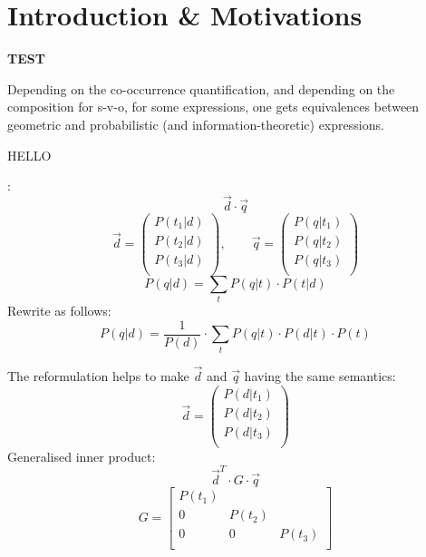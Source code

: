 \section{Introduction \& Motivations}




{\large \bf  TEST }


Depending on the co-occurrence quantification, and depending on the composition for s-v-o, for some expressions, one  gets equivalences between geometric and probabilistic (and information-theoretic) expressions.


HELLO

\cite{Wong/Yao:95}:
\[
\vec{d} \cdot \vec{q}
\]
\[
\vec{d} =
	\left(
	\begin{matrix}
	P(t_1|d)\\
	P(t_2|d)\\
	P(t_3|d)\\
	\end{matrix}
	\right),
\qquad
\vec{q} =
	\left(
	\begin{matrix}
	P(q|t_1)\\
	P(q|t_2)\\
	P(q|t_3)\\
	\end{matrix}
	\right)
\]
\[
P(q|d) = \sum_t P(q|t) \cdot P(t|d)
\]
Rewrite as follows:
\[
P(q|d) = \frac{1}{P(d)} \cdot \sum_t P(q|t) \cdot P(d|t) \cdot P(t)
\]

The reformulation helps
to make $\vec{d}$ and $\vec{q}$ having the same semantics:
\[
\vec{d} =
	\left(
	\begin{matrix}
	P(d|t_1)\\
	P(d|t_2)\\
	P(d|t_3)\\
	\end{matrix}
	\right)
\]
Generalised inner product:
\[
\vec{d}^T \cdot G \cdot \vec{q}
\]
\[
G=
\left[
\begin{matrix}
P(t_1) \\
0 & P(t_2) \\
0 & 0 & P(t_3) \\
\end{matrix}
\right]
\]


